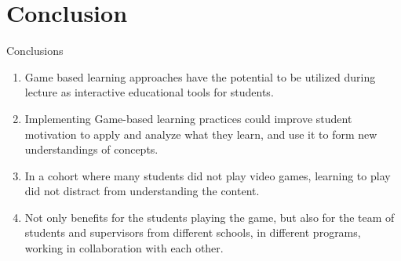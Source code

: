 \documentclass{beamer}
\begin{document}
	\section{Conclusion}
	\begin{frame}{Conclusions}
		\begin{enumerate}	
			\item Game based learning approaches have the potential to be utilized during lecture as interactive educational tools for students. \newline
			\item Implementing Game-based learning practices could improve student motivation to apply and analyze what they learn, and use it to form new understandings of concepts. \newline
			\item In a cohort where many students did not play video games, learning to play did not distract from understanding the content. \newline
			\item Not only benefits for the students playing the game, but also for the team of students and supervisors from different schools, in different programs, working in collaboration with each other.
		\end{enumerate}
	\end{frame}
\end{document}
